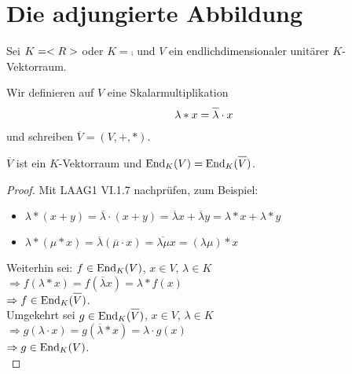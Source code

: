 \section{Die adjungierte Abbildung}

Sei $K=<R>$ oder $K=\comp$ und $V$ ein endlichdimensionaler unitärer $K$-Vektorraum.

\begin{definition}
	Wir definieren auf $V$ eine Skalarmultiplikation
	\begin{align}
		\lambda\ast x=\overline{\lambda}\cdot x\notag
	\end{align}
	und schreiben $\overline{V}=(V,+,\ast)$.
\end{definition}

\begin{lemma}
	$\overline{V}$ ist ein $K$-Vektorraum und $\End_K(V)=\End_K(\overline{V})$.
\end{lemma}
\begin{proof}
	Mit LAAG1 VI.1.7 nachprüfen, zum Beispiel:
	\begin{itemize}
		\item $\lambda\ast (x+y)=\overline{\lambda}\cdot (x+y)=\overline{\lambda} x+\overline{\lambda} y=\lambda\ast x+\lambda\ast y$
		\item $\lambda\ast(\mu\ast x)=\overline{\lambda}(\overline{\mu}\cdot x)=\overline{\lambda\mu}x=(\lambda\mu)\ast x$
	\end{itemize}
	Weiterhin sei: $f\in\operatorname{End}_K(V)$, $x\in V$, $\lambda\in K$ \\
	$\Rightarrow f(\lambda\ast x)=f(\overline{\lambda}x)=\lambda\ast f(x)$ \\
	$\Rightarrow f\in \End_K(\overline{V})$. \\
	Umgekehrt sei $g\in\End_K(\overline{V})$, $x\in V$, $\lambda\in K$ \\
	$\Rightarrow g(\lambda\cdot x)=g(\overline{\lambda}\ast x)=\lambda\cdot g(x)$ \\
	$\Rightarrow g\in \operatorname{End}_K(V)$. \\
\end{proof}


